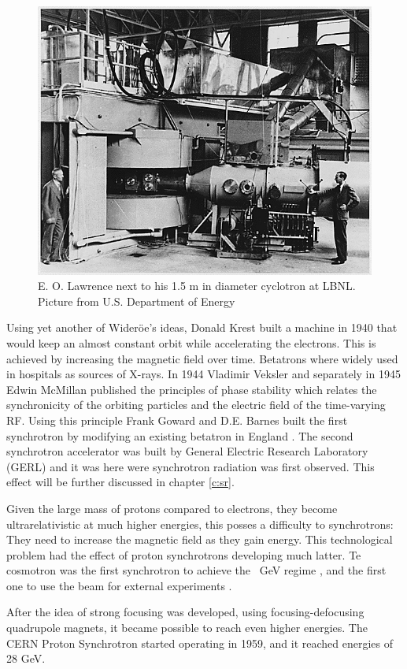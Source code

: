 \begin{figure}
 \centering
  \begin{minipage}{\textwidth}
   \centering
    \includegraphics[width=.49\textwidth]{Pictures/cyclo3}
  	\caption{\label{fig:lawrence}
   		E. O. Lawrence next to his 1.5 m in diameter cyclotron
                        at LBNL.
                      \footnotesize{Picture from U.S. Department of Energy}}
  \end{minipage}
\end{figure}

Using yet another of Wider\"oe's ideas, Donald Krest built a machine in 1940
that would keep an almost constant orbit while accelerating the electrons. This
is achieved by increasing the magnetic field over time. Betatrons where widely
used in hospitals as sources of X-rays.
In 1944 Vladimir Veksler \cite{veksler} and separately in 1945 Edwin McMillan
\cite{PhysRev.McM} published the principles of phase stability which relates the
synchronicity of the orbiting particles and the electric field of the
time-varying RF. Using this principle Frank Goward and D.E. Barnes built the
first synchrotron by modifying an existing betatron in England
\cite{GOWARD1946}. The second synchrotron accelerator was built by General
Electric Research Laboratory (GERL) and it was here were synchrotron radiation
was first observed. This effect will be further discussed in chapter \ref{c:sr}.


Given the large mass of protons compared to electrons, they become
ultrarelativistic at much higher energies, this posses a difficulty to
synchrotrons: They need to increase the magnetic field as they gain energy. This
technological problem had the effect of proton synchrotrons developing much
latter. Te cosmotron was the first synchrotron to achieve the \SI{}{GeV} regime
\cite{cosmotron}, and the first one to use the beam for external experiments
\cite{cosmotron2}.

After the idea of strong focusing was developed, using focusing-defocusing
quadrupole magnets, it became possible to reach even higher energies. The CERN
Proton Synchrotron started operating in 1959, and it reached energies of 28
GeV.

